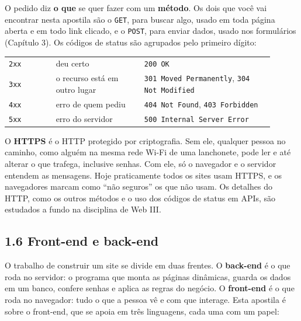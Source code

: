 O pedido diz \textbf{o que} se quer fazer com um \textbf{método}. Os dois que você vai encontrar nesta apostila são o \texttt{GET}, para buscar algo, usado em toda página aberta e em todo link clicado, e o \texttt{POST}, para enviar dados, usado nos formulários (Capítulo 3). Os códigos de status são agrupados pelo primeiro dígito:

\begin{center}
\begin{tabular}{@{}P{0.16\linewidth}P{0.3\linewidth}P{0.44\linewidth}@{}}
\toprule
{}
 &  &  \\
\midrule
\texttt{2xx} & deu certo & \texttt{200 OK} \\
 \texttt{3xx} & o recurso está em outro lugar & \texttt{301 Moved Permanently}, \texttt{304 Not Modified} \\
\texttt{4xx} & erro de quem pediu & \texttt{404 Not Found}, \texttt{403 Forbidden} \\
 \texttt{5xx} & erro do servidor & \texttt{500 Internal Server Error} \\
\bottomrule
\end{tabular}
\end{center}

O \textbf{HTTPS} é o HTTP protegido por criptografia. Sem ele, qualquer pessoa no caminho, como alguém na mesma rede Wi-Fi de uma lanchonete, pode ler e até alterar o que trafega, inclusive senhas. Com ele, só o navegador e o servidor entendem as mensagens. Hoje praticamente todos os sites usam HTTPS, e os navegadores marcam como ``não seguros'' os que não usam. Os detalhes do HTTP, como os outros métodos e o uso dos códigos de status em APIs, são estudados a fundo na disciplina de Web III.

\subsection{1.6 Front-end e back-end}

O trabalho de construir um site se divide em duas frentes. O \textbf{back-end} é o que roda no servidor: o programa que monta as páginas dinâmicas, guarda os dados em um banco, confere senhas e aplica as regras do negócio. O \textbf{front-end} é o que roda no navegador: tudo o que a pessoa vê e com que interage. Esta apostila é sobre o front-end, que se apoia em três linguagens, cada uma com um papel:

